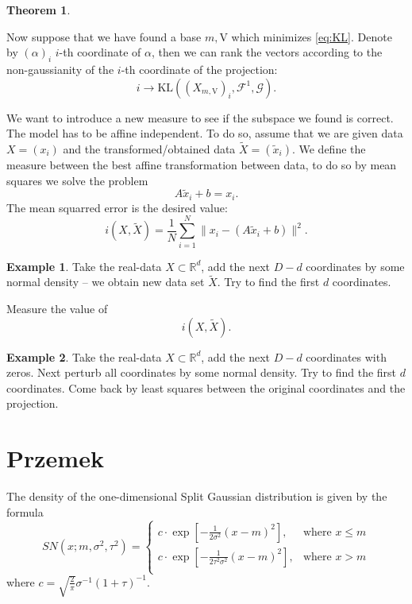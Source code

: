 \documentclass[12pt]{article}
\def\R{\mathbb{R}}
\def\v{\mathrm{V}}
\def\F{\mathcal{F}}
\def\G{\mathcal{G}}
\def\KL{\mathrm{KL}}
\newtheorem{theorem}{Theorem}[section]
\theoremstyle{definition}
\newtheorem{example}{Example}[section]
\begin{document}
\begin{theorem}

\end{theorem}

Now suppose that we have found a base $m,\v$ which minimizes \eqref{eq:KL}.
Denote by $(\alpha)_i$
$i$-th coordinate of $\alpha$, then we can rank the vectors according to the non-gaussianity of the $i$-th coordinate of the projection:
$$
i \to \KL((X_{m,\v})_i,\F^1,\G).
$$
 
We want to introduce a new measure to see if the subspace we found is correct.
The model has to be affine independent. To do so, assume that we are given
data $X=(x_i)$ and the transformed/obtained data $\tilde X=(\tilde x_i)$.
We define the measure between the best affine transformation between data, to do 
so by mean squares we solve the problem
$$
A\tilde x_i+b=x_i.
$$
The mean squarred error is the desired value:
$$
i(X,\tilde X)=\frac{1}{N}\sum_{i=1}^N \|x_i-(A\tilde x_i+b)\|^2.
$$
 
\begin{example}
Take the real-data $X \subset \R^d$, add the next $D-d$ coordinates by some normal density -- we obtain new data set $\tilde X$. Try to find the first $d$ coordinates. 

Measure the value of
$$
i(X,\tilde X).
$$
\end{example}
 
\begin{example}
Take the real-data $X \subset \R^d$, add the next $D-d$ coordinates with zeros.
Next perturb all coordinates by some normal density. Try to find the first $d$ coordinates. Come back by least squares between the original coordinates and the projection.
\end{example}
 
\section{Przemek}

 The density of the one-dimensional Split Gaussian distribution is given by the formula
$$
SN(x;m,\sigma^2,\tau^2) = \left\{ \begin{array}{ll}
c \cdot \exp[-\frac{1}{2\sigma^2}(x-m)^2], & \textrm{where $x\leq m$}\\
c \cdot \exp[-\frac{1}{2\tau^2\sigma^2}(x-m)^2], & \textrm{where $x>m$}\\
\end{array} \right.
$$
where $c=\sqrt{\frac{2}{\pi}}\sigma^{-1}(1+\tau)^{-1}$. 
\end{document}
